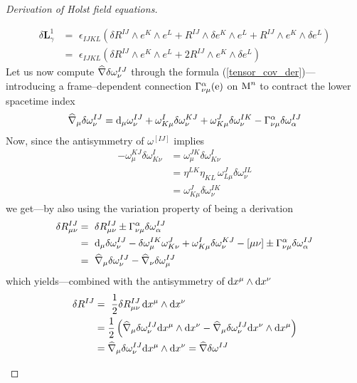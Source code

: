 \begin{proof}[Derivation of Holst field equations]
\begin{enumerate}
    \begin{align*}
        \delta\mathbf{L}^1_\gamma&=\,\,\epsilon_{IJKL}\left(\delta R^{IJ}\wedge e^K\wedge e^L+R^{IJ}\wedge\delta e^K\wedge e^L+R^{IJ}\wedge e^K\wedge\delta e^L\right)\\
        &=\,\,\epsilon_{IJKL}\left(\delta R^{IJ}\wedge e^K\wedge e^L+2R^{IJ}\wedge e^K\wedge\delta e^L\right)
    \end{align*}
    Let us now compute $\widehat{\nabla}\delta\omega^{IJ}_\nu$ through the formula (\ref{tensor_cov_der})---introducing a frame--dependent connection $\Gamma^{\alpha}_{\nu\mu}(\text{\normalfont e})$ on $\text{\normalfont M}^n$ to contract the lower spacetime index
    $$ \widehat{\nabla}_\mu\delta\omega^{IJ}_\nu=\text{\normalfont d}_\mu\omega^{IJ}_\nu+\omega^I_{K\mu}\delta\omega^{KJ}_\nu+\omega^J_{K\mu}\delta\omega^{IK}_\nu-\Gamma_{\nu\mu}^\alpha\delta\omega^{IJ}_\alpha$$
    Now, since the antisymmetry of $\omega^{[IJ]}$ implies
    \begin{align*}
        -\omega^{KJ}_\mu\delta\omega^I_{K\nu}&=\omega^{JK}_\mu\delta\omega^I_{K\nu}\\
        &=\eta^{LK}\eta_{KL}\,\omega^J_{L\mu}\delta\omega^{IL}_\nu\\
        &=\omega^J_{K\mu}\delta\omega^{IK}_\nu
    \end{align*}
    we get---by also using the variation property of being a derivation 
    \begin{align*}
        \delta R^{IJ}_{\mu\nu}&=\,\,\delta R^{IJ}_{\mu\nu}\pm\Gamma^\alpha_{\nu\mu}\delta\omega^{IJ}_\alpha\\
        &=\,\,\d_\mu\delta\omega^{IJ}_\nu-\delta\omega^{IK}_{\mu}\omega^{J}_{K\nu}+\omega^I_{K\mu}\delta\omega^{KJ}_\nu-[\mu\nu]\pm\Gamma^\alpha_{\nu\mu}\delta\omega^{IJ}_\alpha\\
        &=\,\,\nablaw_\mu\delta\omega^{IJ}_\nu-\nablaw_\nu\delta\omega^{IJ}_\mu%
    \end{align*}
    which yields---combined with the antisymmetry of $\text{\normalfont d} x^\mu\wedge\text{\normalfont d} x^\nu$
    \begin{align*}
        \delta R^{IJ}&=\,\,\frac{1}{2}\delta R^{IJ}_{\mu\nu}\,\text{\normalfont d} x^\mu\wedge\text{\normalfont d} x^\nu\\
        &=\frac{1}{2}\left(\widehat{\nabla}_\mu\delta\omega^{IJ}_\nu\text{\normalfont d} x^\mu\wedge\text{\normalfont d} x^\nu-\widehat{\nabla}_\mu\delta\omega^{IJ}_\nu\text{\normalfont d} x^\nu\wedge\text{\normalfont d} x^\mu\right)\\
        &=\widehat{\nabla}_\mu\delta\omega^{IJ}_\nu\text{\normalfont d} x^\mu\wedge\text{\normalfont d} x^\nu=\widehat{\nabla}\delta\omega^{IJ}
    \end{align*}

\end{enumerate}
\end{proof}
